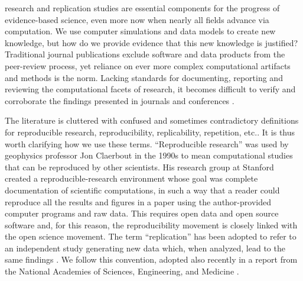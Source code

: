 \documentclass[10pt,journal,compsoc]{IEEEtran}
\begin{document}
 research and replication studies are essential components for the progress of evidence-based science, even more now when nearly all fields advance via computation.
We use computer simulations and data models to create new knowledge,
but how do we provide evidence that this new knowledge is justified? 
Traditional journal publications exclude software and data products from the peer-review process, yet reliance on ever more complex computational artifacts and methods is the norm.
Lacking standards for documenting, reporting and reviewing the computational facets of research, it becomes difficult to verify and corroborate the findings presented in journals and conferences \cite{donoho_et_al_2009}.

The literature is cluttered with confused and sometimes contradictory definitions for reproducible research, reproducibility, replicability, repetition, etc.\cite{barba_2018}.
It is thus worth clarifying how we use these terms.
``Reproducible research'' was used by geophysics professor Jon Claerbout in the 1990s to mean computational studies that can be reproduced by other scientists. His research group at Stanford created a reproducible-research environment\cite{schwab_et_al_2000} whose goal was complete documentation of scientific computations, in such a way that a reader could reproduce all the results and figures in a paper using the author-provided computer programs and raw data.
This requires open data and open source software and, for this reason, the reproducibility movement is closely linked with the open science movement.
The term ``replication'' has been adopted to refer to an independent study generating new data which, when analyzed, lead to the same findings \cite{peng_2011}.
We follow this convention, adopted also recently in a report from the National Academies of Sciences, Engineering, and Medicine \cite{nasa_oss_2018}.
\end{document}
